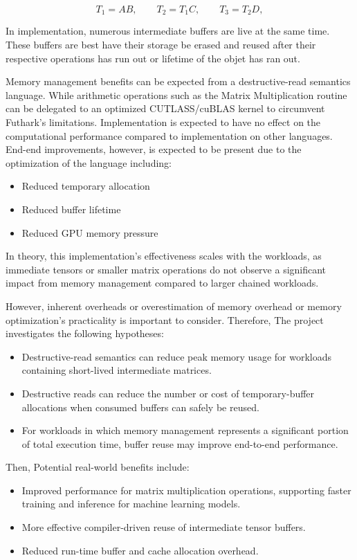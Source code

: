 \documentclass[a4paper]{article}
\begin{document}
	\begin{equation}
		T_1 = A B,\qquad
		T_2 = T_1 C,\qquad
		T_3 = T_2 D,
	\end{equation}
	
	In implementation, numerous intermediate buffers are live at the same time. These buffers are best have their storage be erased and reused after their respective operations has run out or lifetime of the objet has ran out.
	
	Memory management benefits can be expected from a destructive-read semantics language. While arithmetic operations such as the Matrix Multiplication routine can be delegated to an optimized CUTLASS/cuBLAS kernel to circumvent \cite{futhark} Futhark's limitations. Implementation is expected to have no effect on the computational performance compared to implementation on other languages. End-end improvements, however, is expected to be present due to the optimization of the language including:
	\begin{itemize} 
		\item Reduced temporary allocation
		\item Reduced buffer lifetime
		\item Reduced GPU memory pressure
	\end{itemize}
	In theory, this implementation's effectiveness scales with the workloads, as immediate tensors or smaller matrix operations do not observe a significant impact from memory management compared to larger chained workloads.
	
	However, inherent overheads or overestimation of memory overhead or memory optimization's practicality is important to consider. Therefore, The project investigates the following hypotheses:
	
	\begin{itemize}
		\item Destructive-read semantics can reduce peak memory usage for workloads containing short-lived intermediate matrices.
		\item Destructive reads can reduce the number or cost of temporary-buffer allocations when consumed buffers can safely be reused.
		\item For workloads in which memory management represents a significant portion of total execution time, buffer reuse may improve end-to-end performance.
	\end{itemize}
	
	Then, Potential real-world benefits include:
	
	\begin{itemize}
		\item Improved performance for matrix multiplication operations, supporting faster training and inference for machine learning models.
		\item More effective compiler-driven reuse of intermediate tensor buffers.
		\item Reduced run-time buffer and cache allocation overhead.
	\end{itemize}
	
\end{document}
